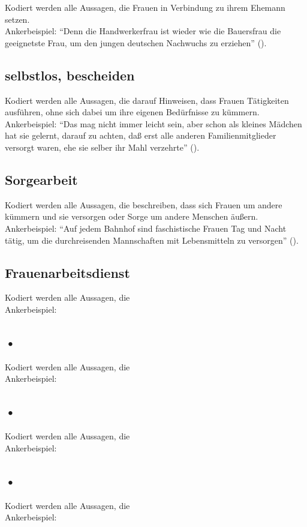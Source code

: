 \documentclass[12pt, titlepage=true, toc=bib]{scrartcl}
\begin{document}
Kodiert werden alle Aussagen, die Frauen in Verbindung zu ihrem Ehemann setzen.\\
Ankerbeispiel: "`Denn die Handwerkerfrau ist wieder wie die Bauersfrau die geeignetste Frau, um den jungen deutschen Nachwuchs zu erziehen"' (\cite[836]{scholtz-klink_frauen_1936}).

\subsection*{selbstlos, bescheiden}

Kodiert werden alle Aussagen, die darauf Hinweisen, dass Frauen Tätigkeiten ausführen, ohne sich dabei um ihre eigenen Bedürfnisse zu kümmern.\\
Ankerbeispiel: "`Das mag nicht immer leicht sein, aber schon als kleines Mädchen hat sie gelernt, darauf zu achten, daß erst alle anderen Familienmitglieder versorgt waren, ehe sie selber ihr Mahl verzehrte"' (\cite[5]{friewart_japanisches_1941}).

\subsection*{Sorgearbeit}

Kodiert werden alle Aussagen, die beschreiben, dass sich Frauen um andere kümmern und sie versorgen oder Sorge um andere Menschen äußern.\\
Ankerbeispiel: "`Auf jedem Bahnhof sind faschistische Frauen Tag und Nacht tätig, um die durchreisenden Mannschaften mit Lebensmitteln zu versorgen"' (\cite[3]{mediel_faschistische_1941}).

\subsection*{Frauenarbeitsdienst}

Kodiert werden alle Aussagen, die \\
Ankerbeispiel:

\subsection*{•}

Kodiert werden alle Aussagen, die \\
Ankerbeispiel:

\subsection*{•}

Kodiert werden alle Aussagen, die \\
Ankerbeispiel:

\subsection*{•}

Kodiert werden alle Aussagen, die \\
Ankerbeispiel:
\end{document}
